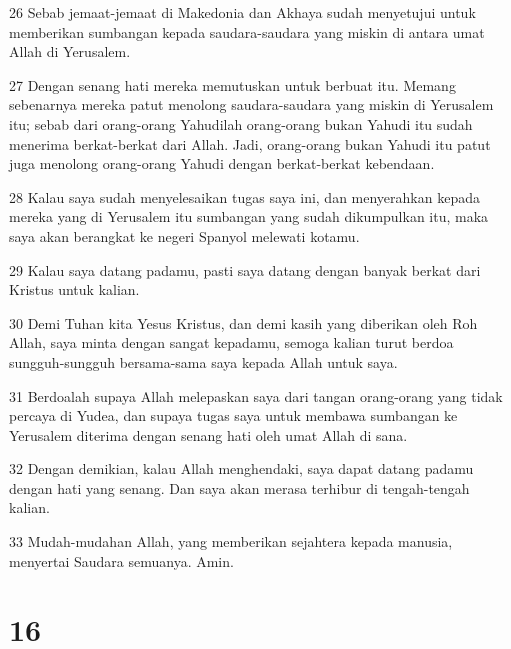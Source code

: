 \par 26 Sebab jemaat-jemaat di Makedonia dan Akhaya sudah menyetujui untuk memberikan sumbangan kepada saudara-saudara yang miskin di antara umat Allah di Yerusalem.
\par 27 Dengan senang hati mereka memutuskan untuk berbuat itu. Memang sebenarnya mereka patut menolong saudara-saudara yang miskin di Yerusalem itu; sebab dari orang-orang Yahudilah orang-orang bukan Yahudi itu sudah menerima berkat-berkat dari Allah. Jadi, orang-orang bukan Yahudi itu patut juga menolong orang-orang Yahudi dengan berkat-berkat kebendaan.
\par 28 Kalau saya sudah menyelesaikan tugas saya ini, dan menyerahkan kepada mereka yang di Yerusalem itu sumbangan yang sudah dikumpulkan itu, maka saya akan berangkat ke negeri Spanyol melewati kotamu.
\par 29 Kalau saya datang padamu, pasti saya datang dengan banyak berkat dari Kristus untuk kalian.
\par 30 Demi Tuhan kita Yesus Kristus, dan demi kasih yang diberikan oleh Roh Allah, saya minta dengan sangat kepadamu, semoga kalian turut berdoa sungguh-sungguh bersama-sama saya kepada Allah untuk saya.
\par 31 Berdoalah supaya Allah melepaskan saya dari tangan orang-orang yang tidak percaya di Yudea, dan supaya tugas saya untuk membawa sumbangan ke Yerusalem diterima dengan senang hati oleh umat Allah di sana.
\par 32 Dengan demikian, kalau Allah menghendaki, saya dapat datang padamu dengan hati yang senang. Dan saya akan merasa terhibur di tengah-tengah kalian.
\par 33 Mudah-mudahan Allah, yang memberikan sejahtera kepada manusia, menyertai Saudara semuanya. Amin.

\chapter{16}

